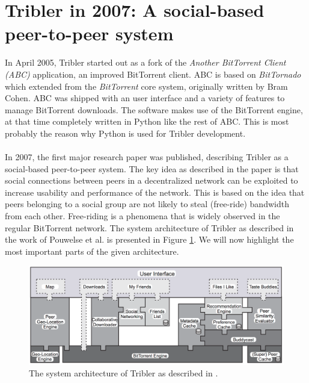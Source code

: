 \section{Tribler in 2007: A social-based peer-to-peer system}
In April 2005, Tribler started out as a fork of the \emph{Another BitTorrent Client (ABC)} application, an improved BitTorrent client. ABC is based on \emph{BitTornado} which extended from the \emph{BitTorrent} core system, originally written by Bram Cohen. ABC was shipped with an user interface and a variety of features to manage BitTorrent downloads. The software makes use of the BitTorrent engine, at that time completely written in Python like the rest of ABC. This is most probably the reason why Python is used for Tribler development.\\\\
In 2007, the first major research paper was published, describing Tribler as a social-based peer-to-peer system\cite{pouwelse2008tribler}. The key idea as described in the paper is that social connections between peers in a decentralized network can be exploited to increase usability and performance of the network. This is based on the idea that peers belonging to a social group are not likely to steal (free-ride) bandwidth from each other. Free-riding is a phenomena that is widely observed in the regular BitTorrent network. The system architecture of Tribler as described in the work of Pouwelse et al. is presented in Figure \ref{fig:tribler-architecture-2008}. We will now highlight the most important parts of the given architecture.

\begin{figure}[t]
	\centering
	\includegraphics[width=1.0\columnwidth]{images/tribler_architecture_2007}
	\caption{The system architecture of Tribler as described in \cite{pouwelse2008tribler}.}
	\label{fig:tribler-architecture-2008}
\end{figure}

